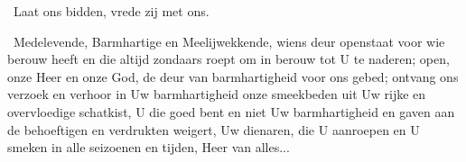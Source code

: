 \documentclass[12pt,twoside,a5paper]{article}
\begin{document}
\begin{halfparskip}
   \dd~Laat ons bidden, vrede zij met ons.

  \cc~Medelevende, Barmhartige en Meelijwekkende, wiens deur openstaat voor wie berouw heeft en die altijd zondaars roept om in berouw tot U te naderen; open, onze Heer en onze God, de deur van barmhartigheid voor ons gebed; ontvang ons verzoek en verhoor in Uw barmhartigheid onze smeekbeden uit Uw rijke en overvloedige schatkist, U die goed bent en niet Uw barmhartigheid en gaven aan de behoeftigen en verdrukten weigert, Uw dienaren, die U aanroepen en U smeken in alle seizoenen en tijden, Heer van alles...
\end{halfparskip}

\end{document}

